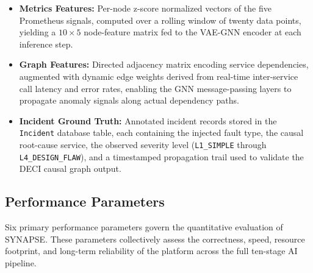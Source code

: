 \begin{itemize}
    \item \textbf{Metrics Features:} Per-node z-score normalized vectors of the five Prometheus signals, computed over a rolling window of twenty data points, yielding a $10 \times 5$ node-feature matrix fed to the VAE-GNN encoder at each inference step.
    \item \textbf{Graph Features:} Directed adjacency matrix encoding service dependencies, augmented with dynamic edge weights derived from real-time inter-service call latency and error rates, enabling the GNN message-passing layers to propagate anomaly signals along actual dependency paths.
    \item \textbf{Incident Ground Truth:} Annotated incident records stored in the \texttt{Incident} database table, each containing the injected fault type, the causal root-cause service, the observed severity level (\texttt{L1\_SIMPLE} through \texttt{L4\_DESIGN\_FLAW}), and a timestamped propagation trail used to validate the DECI causal graph output.
\end{itemize}

\subsection{Performance Parameters}

\hspace*{0.3in} Six primary performance parameters govern the quantitative evaluation of SYNAPSE. These parameters collectively assess the correctness, speed, resource footprint, and long-term reliability of the platform across the full ten-stage AI pipeline.

